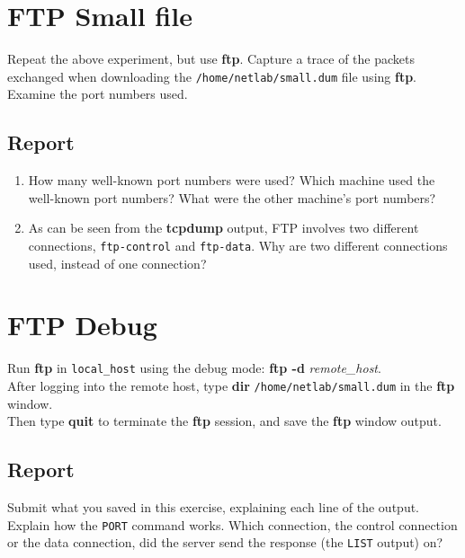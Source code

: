 \documentclass{../UTNetLab}
\begin{document}
\section{FTP Small file}
	Repeat the above experiment, but use \textbf{ftp}.
	Capture a trace of the packets exchanged when downloading the \texttt{/home/netlab/small.dum} file using \textbf{ftp}. \\
	Examine the port numbers used.
	\subsection*{Report}
	\begin{enumerate}
		\item How many well-known port numbers were used?
		Which machine used the well-known port numbers?
		What were the other machine’s port numbers?
		\item As can be seen from the \textbf{tcpdump} output, FTP involves two different connections, \texttt{ftp-control} and \texttt{ftp-data}.
		Why are two different connections used, instead of one connection?
	\end{enumerate}

\section{FTP Debug}
	Run \textbf{ftp} in \texttt{local\_host} using the debug mode: \textbf{ftp -d} \textit{remote\_host}. \\
	After logging into the remote host, type \textbf{dir} \texttt{/home/netlab/small.dum} in the \textbf{ftp} window. \\
	Then type \textbf{quit} to terminate the \textbf{ftp} session, and save the \textbf{ftp} window output.
	\subsection*{Report}
	Submit what you saved in this exercise, explaining each line of the output.
	Explain how the \texttt{PORT} command works.
	Which connection, the control connection or the data connection, did the server send the response (the \texttt{LIST} output) on?
\end{document}
